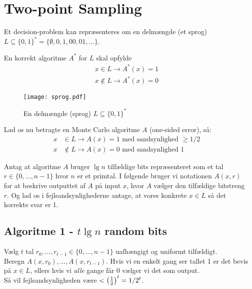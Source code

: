 \section{Two-point Sampling}
Et decision-problem kan repræsenteres om en delmængde (et sprog) $L \subseteq \{0, 1\}^\ast = \{\emptyset, 0, 1, 00, 01, \dots \}$.

En korrekt algoritme $A^\ast$ for $L$ skal opfylde
\begin{align*}
  x \in L \rightarrow A^\ast(x) = 1\\
  x \notin L \rightarrow A^\ast(x) = 0
\end{align*}

\begin{figure}[H]
  \begin{center}
  \texttt{[image: sprog.pdf]}
  \end{center}
  \caption{En delmængde (sprog) $L \subseteq \{0, 1\}^\ast$}
  \label{fig:sprog}
\end{figure}

Lad os nu betragte en Monte Carlo algoritme $A$ (one-sided error), så:
\begin{align*}
  x &\in L \rightarrow A(x) = 1 \text{ med sandsynlighed $\geq 1/2$}\\
  x &\notin L \rightarrow A(x) = 0 \text{ med sandsynlighed $1$}
\end{align*}

Antag at algoritme $A$ bruger $\lg n$ tilfældige bits repræsenteret som et tal $r \in \{0, ..., n-1 \}$ hvor $n$ er et primtal. I følgende bruger vi notationen $A(x, r)$ for at beskrive outputtet af $A$ på input $x$, hvor $A$ vælger den tilfældige bitstreng $r$. Og lad os i fejlsandsynlighederne antage, at vores konkrete $x \in L$ så det korrekte svar er 1.

\subsection{Algoritme 1 - $t \lg n$ random bits}
Vælg $t$ tal $r_0, \dots, r_{t-1} \in \{0, \dots, n-1\}$ uafhængigt og uniformt tilfældigt.\\
Beregn $A(x, r_0), \dots, A(x, r_{t-1})$. Hvis vi en enkelt gang ser tallet 1 er det bevis på $x \in L$, ellers hvis vi \emph{alle} gange får 0 vælger vi det som output.\\

Så vil fejlsandsynligheden være $< \left( \frac{1}{2} \right)^t = 1/2^t$.\\

